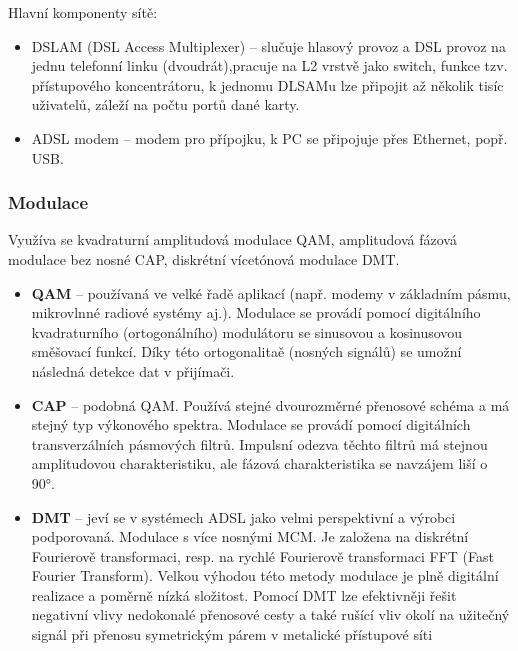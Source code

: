 Hlavní komponenty sítě:
\begin{itemize}
    \item DSLAM (DSL Access Multiplexer) -- slučuje hlasový provoz a DSL provoz na jednu telefonní linku (dvoudrát),pracuje na L2 vrstvě jako switch, funkce tzv. přístupového koncentrátoru, k jednomu DLSAMu lze připojit až několik tisíc uživatelů, záleží na počtu portů dané karty.
    \item ADSL modem -- modem pro přípojku, k PC se připojuje přes Ethernet, popř. USB.
\end{itemize}

\subsubsection{Modulace}
Využíva se kvadraturní amplitudová modulace QAM, amplitudová fázová modulace bez nosné CAP, diskrétní vícetónová modulace DMT.
\begin{itemize}
    \item \textbf{QAM} -- používaná ve velké řadě aplikací (např. modemy v základním pásmu, mikrovlnné radiové systémy aj.). Modulace se provádí pomocí digitálního kvadraturního (ortogonálního) modulátoru se sinusovou a kosinusovou směšovací funkcí. Díky této ortogonalitaě (nosných signálů) se umožní následná detekce dat v přijímači.
    \item \textbf{CAP} -- podobná QAM. Používá stejné dvourozměrné přenosové schéma a má stejný typ výkonového spektra. Modulace se provádí pomocí digitálních transverzálních pásmových filtrů. Impulsní odezva těchto filtrů má stejnou amplitudovou charakteristiku, ale fázová charakteristika se navzájem liší o 90°.
    \item \textbf{DMT} -- jeví se v systémech ADSL jako velmi perspektivní a výrobci podporovaná. Modulace s více nosnými MCM. Je založena na diskrétní Fourierově transformaci, resp. na rychlé Fourierově transformaci FFT (Fast Fourier Transform). Velkou výhodou této metody modulace je plně digitální realizace a poměrně nízká složitost. Pomocí DMT lze efektivněji řešit negativní vlivy nedokonalé přenosové cesty a také rušící vliv okolí na užitečný signál při přenosu symetrickým párem v metalické přístupové síti
\end{itemize}
\newpage

